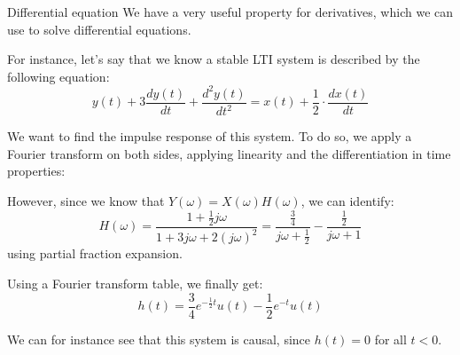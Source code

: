 \documentclass[a4paper]{article}
\begin{document}
\begin{parag}{Differential equation}
    We have a very useful property for derivatives, which we can use to solve differential equations.

    For instance, let's say that we know a stable LTI system is described by the following equation: 
    \[y\left(t\right) + 3 \frac{dy\left(t\right)}{dt} + \frac{d^2 y\left(t\right)}{dt^2} = x\left(t\right) + \frac{1}{2} \cdot \frac{dx\left(t\right)}{dt}\]
    
    We want to find the impulse response of this system. To do so, we apply a Fourier transform on both sides, applying linearity and the differentiation in time properties: 
    
    However, since we know that $Y\left(\omega\right) = X\left(\omega\right) H\left(\omega\right)$, we can identify: 
    \[H\left(\omega\right) = \frac{1 + \frac{1}{2} j \omega}{1 + 3 j \omega + 2 \left(j \omega\right)^2} = \frac{\frac{3}{4}}{j \omega + \frac{1}{2}} - \frac{\frac{1}{2}}{j \omega + 1}\]
    using partial fraction expansion.

    Using a Fourier transform table, we finally get: 
    \[h\left(t\right)= \frac{3}{4} e^{- \frac{1}{2}t}u\left(t\right) - \frac{1}{2}e^{- t} u\left(t\right)\]

    We can for instance see that this system is causal, since $h\left(t\right) = 0$ for all $t < 0$.
\end{parag}
\end{document}
